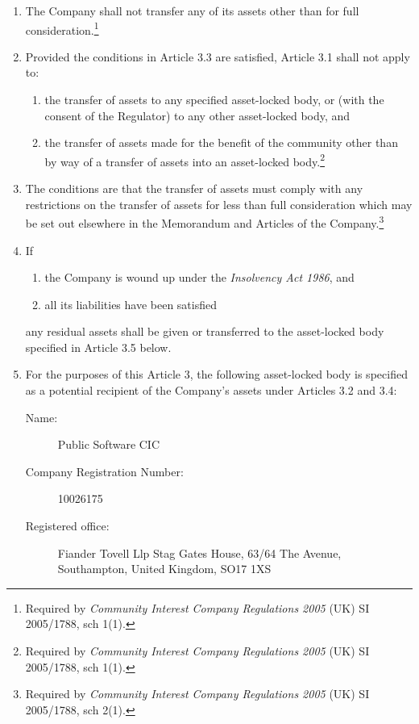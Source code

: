 \documentclass[a4paper,12pt]{article}
\renewcommand{\labelenumii}{(\alph{enumii})}
\begin{document}
\begin{enumerate}
  \color{red}
  \item The Company shall not transfer any of its assets other than for full consideration.\footnote{Required by \textit{Community Interest Company Regulations 2005} (UK) SI 2005/1788, sch 1(1).}
  \item Provided the conditions in Article 3.3 are satisfied, Article 3.1 shall not apply to:
  \begin{enumerate}
    \renewcommand{\labelenumii}{(\alph{enumii})}
    \item the transfer of assets to any specified asset-locked body, or (with the consent of the Regulator) to any other asset-locked body, and
    \item the transfer of assets made for the benefit of the community other than by way of a transfer of assets into an asset-locked body.\footnote{Required by \textit{Community Interest Company Regulations 2005} (UK) SI 2005/1788, sch 1(1).}
  \end{enumerate}
  \item The conditions are that the transfer of assets must comply with any restrictions on the transfer of assets for less than full consideration which may be set out elsewhere in the Memorandum and Articles of the Company.\footnote{Required by \textit{Community Interest Company Regulations 2005} (UK) SI 2005/1788, sch 2(1).}\color{black}
  \item If
  \begin{enumerate}
    \item the Company is wound up under the \textit{Insolvency Act 1986}, and
    \item all its liabilities have been satisfied
  \end{enumerate}
  any residual assets shall be given or transferred to the asset-locked body specified in Article 3.5 below.
  \item For the purposes of this Article 3, the following asset-locked body is specified as a potential recipient of the Company's assets under Articles 3.2 and 3.4:
  \begin{description}
    \item[Name:] Public Software CIC
    \item[Company Registration Number:] 10026175
    \item[Registered office:] Fiander Tovell Llp Stag Gates House, 63/64 The Avenue, Southampton, United Kingdom, SO17 1XS
  \end{description}
\end{enumerate}
\end{document}
